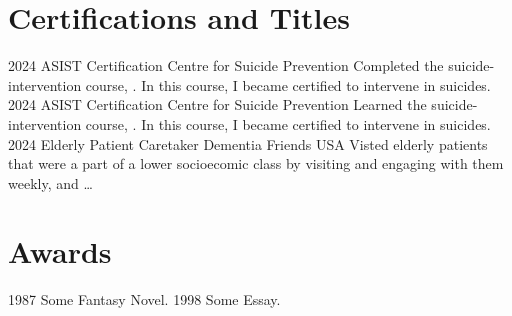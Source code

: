 \documentclass[letterpaper]{twentyonesecondcv} %
\begin{document}
{\section{Certifications and Titles}
    
    \begin{twenty} %
        \twentyitem
        {2024}
        {ASIST Certification}
        {Centre for Suicide Prevention}
        {Completed the suicide-intervention course, . In this course, I became certified to intervene in suicides.}
        \twentyitem
        {2024}
        {ASIST Certification}
        {Centre for Suicide Prevention}
        {Learned the suicide-intervention course, . In this course, I became certified to intervene in suicides.}
        \twentyitem
        {2024}
        {Elderly Patient Caretaker}
        {Dementia Friends USA}
        {Visted elderly patients that were a part of a lower socioecomic class by visiting and engaging with them weekly, and \dots}
    \end{twenty}
    
    \renewcommand{\theenumi}{\arabic{enumi}}
\renewcommand{\labelenumi}{\theenumi.}
\section{Awards}
    
    \begin{twentyshort}
      \twentyitemshort
        {1987}
        {Some Fantasy Novel.}
      \twentyitemshort
        {1998}
        {Some Essay.}
    \end{twentyshort}

}
\end{document}
